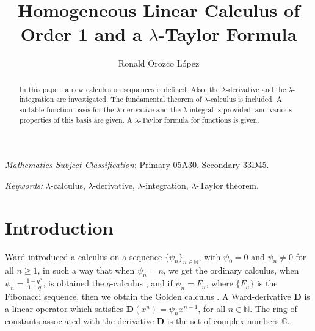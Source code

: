 \documentclass[12pt]{article}
\newcommand{\C}{\mathbb{C}}
\newcommand{\N}{\mathbb{N}}
\newcommand{\D}{\mathbf{D}}
\begin{document}
\title{\textbf{Homogeneous Linear Calculus of Order 1 and a $\lambda$-Taylor Formula}}
\author{Ronald Orozco L\'opez}

\newcommand{\Addresses}{{%
  \bigskip
  \footnotesize

  \textit{E-mail address}, R.~Orozco: \texttt{rj.orozco@uniandes.edu.co}
  
}}



\maketitle

\begin{abstract}
In this paper, a new calculus on sequences is defined. Also, the $\lambda$-derivative and the $\lambda$-integration are investigated. The fundamental theorem of $\lambda$-calculus is included. A suitable function basis for the $\lambda$-derivative and the $\lambda$-integral is provided, and various properties of this basis are given. A $\lambda$-Taylor formula for functions is given. 
\end{abstract}
 {\it Mathematics Subject Classification}:
Primary 05A30. Secondary 33D45.

\noindent \emph{Keywords: } $\lambda$-calculus, $\lambda$-derivative, $\lambda$-integration, $\lambda$-Taylor theorem.


\section{Introduction}

Ward \cite{ward} introduced a calculus on a sequence $\{\psi_{n}\}_{n\in\N}$, with $\psi_{0}=0$ and $\psi_{n}\neq0$ for all $n\geq1$, in such a way that when $\psi_{n}=n$, we get the ordinary calculus, when $\psi_{n}=\frac{1-q^n}{1-q}$, is obtained the $q$-calculus \cite{jackson1,jackson2,jackson3}, and if $\psi_{n}=F_{n}$, where $\{F_{n}\}$ is the Fibonacci sequence, then we obtain the Golden calculus \cite{pashaev1,pashaev2}. A Ward-derivative $\D$ is a linear operator which satisfies  $\D(x^n)=\psi_{n}x^{n-1}$, for all $n\in\N$. The ring of constants associated with the derivative $\D$ is the set of complex numbers $\C$.
\end{document}
